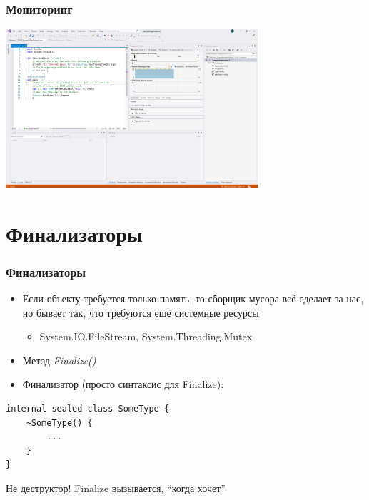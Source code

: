 \documentclass{../../slides-style}
\begin{document}
    \begin{frame}[fragile]
        \frametitle{Мониторинг}
        \begin{center}
            \includegraphics[width=0.7\textwidth]{vsMonitoring.png}
        \end{center}
    \end{frame}

    \section{Финализаторы}

    \begin{frame}[fragile]
        \frametitle{Финализаторы}
        \begin{itemize}
            \item Если объекту требуется только память, то сборщик мусора всё сделает за нас, но бывает так, что требуются ещё системные ресурсы
            \begin{itemize}
                \item System.IO.FileStream, System.Threading.Mutex
            \end{itemize}
            \item Метод \textit{Finalize()}
            \item Финализатор (просто синтаксис для Finalize):
        \end{itemize}
        \begin{footnotesize}
            \begin{verbatim}
internal sealed class SomeType {
    ~SomeType() {
        ...
    }
}
            \end{verbatim}
        \end{footnotesize}
        Не деструктор! Finalize вызывается, ``когда хочет''
    \end{frame}
\end{document}
